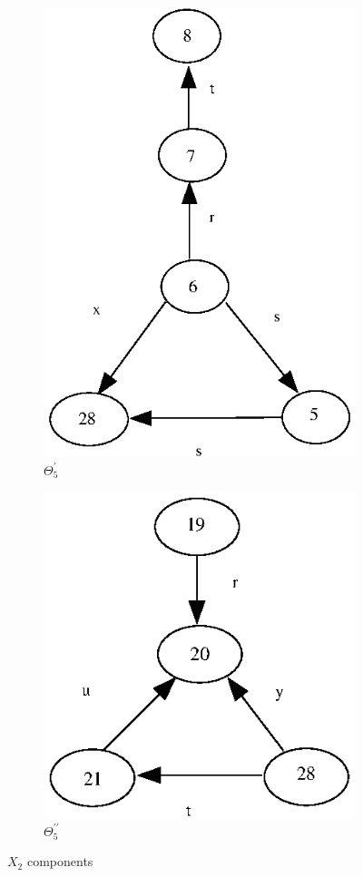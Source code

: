\documentclass[a4paper,12pt]{article}
\numberwithin{equation}{section}
\numberwithin{figure}{section}
\begin{document}
\begin{figure}
\begin{center}
\begin{subfigure}[b]{.3\columnwidth}
\includegraphics[scale=0.45, bb=0 0  82 280]{python/ex_K_i4.eps}
\caption{$\Theta_5^\prime$}
\label{fig:K_i4}
\end{subfigure}
\hspace*{2cm}
\begin{subfigure}[b]{.3\columnwidth}
\includegraphics[scale=0.45, bb=0 0 82 210]{python/ex_K_j4.eps}
\caption{$\Theta_5^{\prime\prime}$}
\label{fig:K_j4}
\end{subfigure}
\end{center}
\caption{$X_2$ components}
\label{fig:KY5}
\end{figure}
\end{document}

